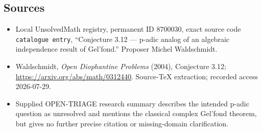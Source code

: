 \documentclass[11pt]{article}
\begin{document}
\subsection{Sources}
\begin{itemize}
\item Local UnsolvedMath registry, permanent ID \(8700030\), exact source code \texttt{catalogue entry}, ``Conjecture 3.12 --- p-adic analog of an algebraic independence result of Gel'fond.'' Proposer Michel Waldschmidt.
\item Waldschmidt, \emph{Open Diophantine Problems} (2004), Conjecture 3.12; \url{https://arxiv.org/abs/math/0312440}. Source-TeX extraction; recorded access 2026-07-29.
\item Supplied OPEN-TRIAGE research summary describes the intended p-adic question as unresolved and mentions the classical complex Gel'fond theorem, but gives no further precise citation or missing-domain clarification.
\end{itemize}
\end{document}
